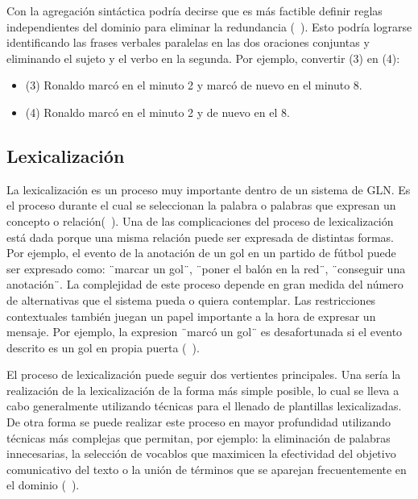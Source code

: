     Con la agregación sintáctica podría decirse que es más factible definir reglas independientes del dominio para eliminar la 
redundancia (~\cite{Gatt2018SurveyOT}). Esto podría lograrse identificando las frases verbales paralelas en las dos oraciones conjuntas y eliminando el sujeto y el verbo en la segunda. 
Por ejemplo, convertir (3) en (4):

\begin{itemize}
    \item (3) Ronaldo marcó en el minuto 2 y marcó de nuevo en el minuto 8.
    \item (4) Ronaldo marcó en el minuto 2 y de nuevo en el 8.
\end{itemize}
    


\subsection{Lexicalización}\label{subsection:lexicalizacion}

    La lexicalización es un proceso muy importante dentro de un sistema de GLN. Es el proceso durante el cual se 
seleccionan la palabra o palabras que expresan un concepto o relaci\'on(~\cite{Reiter1997BuildingAN}). Una de las 
complicaciones del proceso de lexicalización est\'a dada porque una misma relación puede ser expresada de 
distintas formas. Por ejemplo, el evento de la anotación de un gol en un partido de fútbol puede ser expresado como:
¨marcar un gol¨, ¨poner el balón en la red¨, ¨conseguir una anotación¨. La complejidad de este proceso depende en gran 
medida del número de alternativas que el sistema pueda o quiera contemplar. Las restricciones contextuales también juegan 
un papel importante a la hora de expresar un mensaje. Por ejemplo, la expresion ¨marcó un gol¨ es desafortunada si el evento 
descrito es un gol en propia puerta (~\cite{Gatt2018SurveyOT}).

    El proceso de lexicalización puede seguir dos vertientes principales. Una ser\'ia la realizaci\'on de la  
lexicalización de la forma m\'as simple posible, lo cual se lleva a cabo generalmente utilizando t\'ecnicas para el llenado de 
plantillas lexicalizadas. De otra forma se puede realizar este proceso en mayor profundidad utilizando t\'ecnicas m\'as complejas  
que permitan, por ejemplo: la eliminaci\'on de palabras innecesarias, la selección de vocablos que maximicen la efectividad del objetivo 
comunicativo del texto o la uni\'on de t\'erminos que se aparejan frecuentemente en el dominio (~\cite{Perera2017RecentAI}).

